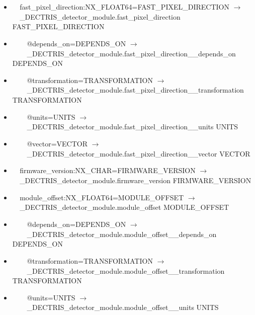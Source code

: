 \documentclass[11pt]{article}
\begin{document}
{{\begin{itemize}
\item{\verb|  |fast\_pixel\_direction:NX\_FLOAT64=FAST\_PIXEL\_DIRECTION $\rightarrow$\\
\verb|  |\_DECTRIS\_detector\_module.fast\_pixel\_direction FAST\_PIXEL\_DIRECTION}

\item{\verb|    |@depends\_on=DEPENDS\_ON $\rightarrow$\\
\verb|    |\_DECTRIS\_detector\_module.fast\_pixel\_direction\_\_depends\_on DEPENDS\_ON}

\item{\verb|    |@transformation=TRANSFORMATION $\rightarrow$\\
\verb|    |\_DECTRIS\_detector\_module.fast\_pixel\_direction\_\_transformation TRANSFORMATION}

\item{\verb|    |@units=UNITS $\rightarrow$\\
\verb|    |\_DECTRIS\_detector\_module.fast\_pixel\_direction\_\_units UNITS}

\item{\verb|    |@vector=VECTOR $\rightarrow$\\
\verb|    |\_DECTRIS\_detector\_module.fast\_pixel\_direction\_\_vector VECTOR}

\item{\verb|  |firmware\_version:NX\_CHAR=FIRMWARE\_VERSION $\rightarrow$\\
\verb|  |\_DECTRIS\_detector\_module.firmware\_version FIRMWARE\_VERSION}

\item{\verb|  |module\_offset:NX\_FLOAT64=MODULE\_OFFSET $\rightarrow$\\
\verb|  |\_DECTRIS\_detector\_module.module\_offset MODULE\_OFFSET}

\item{\verb|    |@depends\_on=DEPENDS\_ON $\rightarrow$\\
\verb|    |\_DECTRIS\_detector\_module.module\_offset\_\_depends\_on DEPENDS\_ON}

\item{\verb|    |@transformation=TRANSFORMATION $\rightarrow$\\
\verb|    |\_DECTRIS\_detector\_module.module\_offset\_\_transformation TRANSFORMATION}

\item{\verb|    |@units=UNITS $\rightarrow$\\
\verb|    |\_DECTRIS\_detector\_module.module\_offset\_\_units UNITS}


\end{itemize}}}
\end{document}
